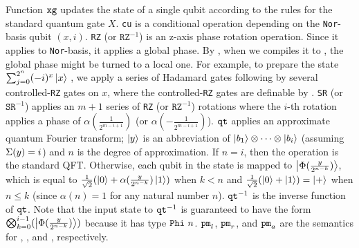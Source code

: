 Function $\texttt{xg}$ updates the state of a single
qubit according to the rules for the standard quantum gate $X$.  
\texttt{cu} is a conditional operation
depending on the \texttt{Nor}-basis qubit $(x,i)$. 
\texttt{RZ} (or $\texttt{RZ}^{-1}$) is an z-axis phase rotation operation.
Since it applies to \texttt{Nor}-basis, it applies a global phase.
By , when we compiles it to \sqir,
the global phase might be turned to a local one.
For example, to prepare the state $\sum_{j=0}^{2^n}(-i)^x\left\vert{x}\right\rangle$ \cite{ChildsNAND}, 
we apply a series of Hadamard gates following by several controlled-\texttt{RZ} gates on $x$,
where the controlled-\texttt{RZ} gates are definable by \oqasm.
\texttt{SR} (or
$\texttt{SR}^{-1}$) applies an $m+1$ series of \texttt{RZ} (or
$\texttt{RZ}^{-1}$) rotations where the $i$-th rotation
applies a phase of $\alpha({\frac{1}{2^{m-i+1}}})$
(or $\alpha({-\frac{1}{2^{m-i+1}}})$).
$\texttt{qt}$ applies an approximate quantum Fourier transform; $\left\vert{y}\right\rangle$ is an abbreviation of
$\left\vert{b_1}\right\rangle\otimes \cdots \otimes \left\vert{b_i}\right\rangle$ (assuming $\Sigma(y)=i$)
and $n$ is the degree of approximation.
If $n = i$, then the operation is the standard QFT\@.
Otherwise, each qubit in the state is mapped to $\left\vert{\Phi(\frac{y}{2^{n-k}})}\right\rangle$, which is equal to $\frac{1}{\sqrt{2}}(\left\vert{0}\right\rangle + \alpha(\frac{y}{2^{n-k}})\left\vert{1}\right\rangle)$ when $k < n$ and $\frac{1}{\sqrt{2}}(\left\vert{0}\right\rangle + \left\vert{1}\right\rangle) = \left\vert{+}\right\rangle$ when $n \leq k$ (since $\alpha(n) = 1$ for any natural number $n$).
$\texttt{qt}^{-1}$ is the inverse function of $\texttt{qt}$. 
Note that the input state to $\texttt{qt}^{-1}$ is guaranteed to have the form $\bigotimes_{k=0}^{i-1}(\left\vert{\Phi(\frac{y}{2^{n-k}})}\right\rangle)$ because it has type $\texttt{Phi}~{n}$.
$\texttt{pm}_l$, $\texttt{pm}_r$, and
$\texttt{pm}_a$ are the semantics for , 
, and , respectively.   
